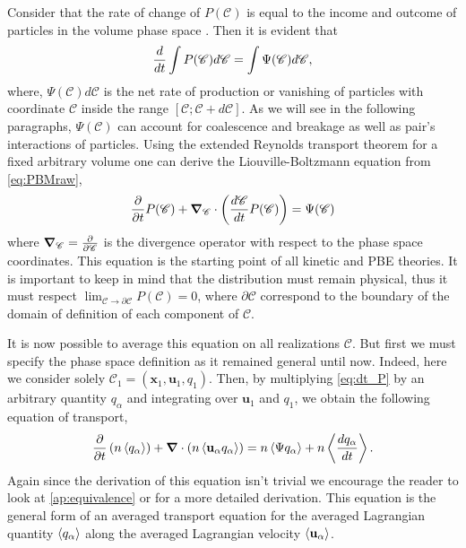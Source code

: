 Consider that the rate of change of $P(\mathscr{C})$ is equal to the income and outcome of particles in the volume phase space \citep{sporleder2012population}.
Then it is evident that
\begin{equation}
    \frac{d}{d t}\int P(\mathscr{C}) d\mathscr{C} 
    = \int \Psi(\mathscr{C}) d\mathscr{C},
    \label{eq:PBMraw}
\end{equation}
where, $\Psi(\mathscr{C})d\mathscr{C}$ is the net rate of production or vanishing of particles with coordinate $\mathscr{C}$ inside the range $[\mathscr{C};\mathscr{C}+d\mathscr{C}]$. 
As we will see in the following paragraphs, $\Psi(\mathscr{C})$ can account for coalescence and breakage as well as pair's interactions of particles.
Using the extended Reynolds transport theorem for a fixed arbitrary volume one can derive the Liouville-Boltzmann equation from \ref{eq:PBMraw}\citep{zaepffel2011modelisation,rao2008introduction,zhang1994ensemble},
\begin{equation}
    \frac{\partial}{\partial t} P(\mathscr{C})
    + \bm{\nabla}_{\mathscr{C}} \cdot
    \left(
        \frac{d\mathscr{C}}{dt}  
        P(\mathscr{C})
    \right)
    = \Psi(\mathscr{C})
    \label{eq:dt_P}
\end{equation}
where $\bm{\nabla}_{\mathscr{C}} = \frac{\partial}{\partial \mathscr{C}}$ is the divergence operator with respect to the phase space coordinates. 
This equation is the starting point of all kinetic and PBE theories.
It is important to keep in mind that the distribution must remain physical, thus it must respect $\lim_{\mathscr{C} \rightarrow \partial\mathscr{C}} P(\mathscr{C})= 0$, where $\partial \mathscr{C}$ correspond to the boundary of the domain of definition of each component of $\mathscr{C}$. 

It is now possible to average this equation on all realizations $\mathscr{C}$. 
But first we must specify the phase space definition as it remained general until now. 
Indeed, here we consider solely $\mathscr{C}_1 = (\textbf{x}_1,\textbf{u}_1,q_1)$. 
Then, by multiplying \ref{eq:dt_P} by an arbitrary quantity $q_\alpha$ and integrating over $\textbf{u}_1$ and $q_1$, we obtain the following equation of transport,
\begin{equation}
    \label{eq:maxwell}
    \frac{\partial}{\partial t} \left( n \left<q_\alpha\right>\right)
    + \bm{\nabla} \cdot \left(n \left<\textbf{u}_\alpha q_\alpha\right>\right)
    = n \left<\Psi q_\alpha\right>
    + n \left<\frac{dq_\alpha}{dt}\right>.
\end{equation}
Again since the derivation of this equation isn't trivial we encourage the reader to look at \ref{ap:equivalence} or \citet{rao2008introduction,zaepffel2011modelisation} for a more detailed derivation. 
This equation is the general form of an averaged transport equation for the averaged Lagrangian quantity $\left<q_\alpha\right>$ along the averaged Lagrangian velocity $\left<\textbf{u}_\alpha\right>$.

